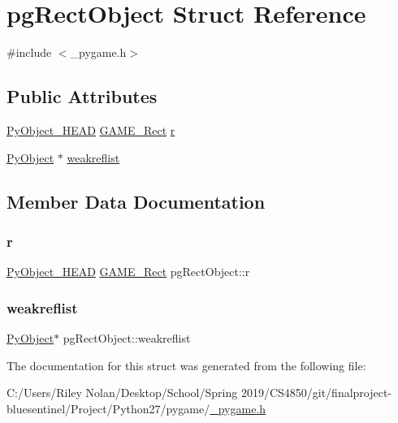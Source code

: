 \hypertarget{structpg_rect_object}{}\section{pg\+Rect\+Object Struct Reference}
\label{structpg_rect_object}


{\ttfamily \#include $<$\+\_\+pygame.\+h$>$}

\subsection*{Public Attributes}
\begin{DoxyCompactItemize}
\item 
\mbox{\hyperlink{_python27_2object_8h_a0bf35c1f3ea13f925de94d8593db3b7e}{Py\+Object\+\_\+\+H\+E\+AD}} \mbox{\hyperlink{struct_g_a_m_e___rect}{G\+A\+M\+E\+\_\+\+Rect}} \mbox{\hyperlink{structpg_rect_object_a89351b7c8557b5f028771944af991774}{r}}
\item 
\mbox{\hyperlink{_python27_2object_8h_aadc84ac7aed2cfa6f20c25f62bf3dac7}{Py\+Object}} $\ast$ \mbox{\hyperlink{structpg_rect_object_afecff16ded6797cbf9dfe6566a705bd5}{weakreflist}}
\end{DoxyCompactItemize}


\subsection{Member Data Documentation}
\mbox{\label{structpg_rect_object_a89351b7c8557b5f028771944af991774}} 
\subsubsection{\texorpdfstring{r}{r}}
{\footnotesize\ttfamily \mbox{\hyperlink{_python27_2object_8h_a0bf35c1f3ea13f925de94d8593db3b7e}{Py\+Object\+\_\+\+H\+E\+AD}} \mbox{\hyperlink{struct_g_a_m_e___rect}{G\+A\+M\+E\+\_\+\+Rect}} pg\+Rect\+Object\+::r}

\mbox{\label{structpg_rect_object_afecff16ded6797cbf9dfe6566a705bd5}} 
\subsubsection{\texorpdfstring{weakreflist}{weakreflist}}
{\footnotesize\ttfamily \mbox{\hyperlink{_python27_2object_8h_aadc84ac7aed2cfa6f20c25f62bf3dac7}{Py\+Object}}$\ast$ pg\+Rect\+Object\+::weakreflist}



The documentation for this struct was generated from the following file\+:\begin{DoxyCompactItemize}
\item 
C\+:/\+Users/\+Riley Nolan/\+Desktop/\+School/\+Spring 2019/\+C\+S4850/git/finalproject-\/bluesentinel/\+Project/\+Python27/pygame/\mbox{\hyperlink{__pygame_8h}{\+\_\+pygame.\+h}}\end{DoxyCompactItemize}
